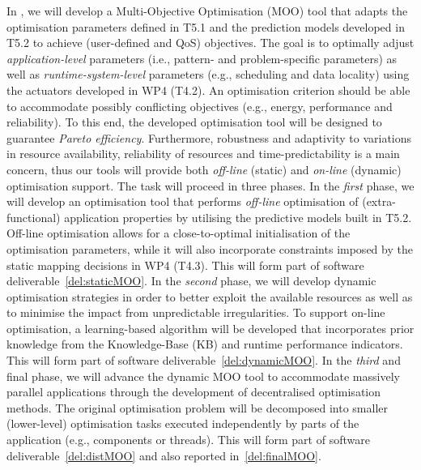 \begin{Workpackage}{\thewpno}
\begin{Task}
In \theTask, we will develop a Multi-Objective Optimisation (MOO) tool that adapts the optimisation parameters defined in T5.1 and the prediction models developed in T5.2 to achieve (user-defined and QoS) objectives. The goal is to optimally adjust \emph{application-level} parameters (i.e., pattern- and problem-specific parameters) as well as \emph{runtime-system-level} parameters (e.g., scheduling and data locality) using the actuators developed in WP4 (T4.2). An optimisation criterion should be able to accommodate possibly conflicting objectives (e.g., energy, performance and reliability). To this end, the developed optimisation tool will be designed to guarantee \emph{Pareto efficiency}. Furthermore, robustness and adaptivity to variations in resource availability, reliability of resources and time-predictability is a main concern, thus our tools will provide both \emph{off-line} (static) and \emph{on-line} (dynamic) optimisation support.
%
%
The task will proceed in three phases.
In the \emph{first} phase, we will develop an optimisation tool that performs \emph{off-line} optimisation of (extra-functional) application properties by utilising the predictive models built in T5.2. Off-line optimisation allows for a close-to-optimal initialisation of the optimisation parameters, while it will also incorporate constraints imposed by the static mapping decisions in WP4 (T4.3). This will form part of software deliverable~\ref{del:staticMOO}. In the \emph{second} phase, we will develop dynamic optimisation strategies in order to better exploit the available resources as well as to minimise the impact from unpredictable irregularities. To support on-line optimisation, a learning-based algorithm will be developed that incorporates prior knowledge from the 
Knowledge-Base (KB) and runtime performance indicators. This will form part of software deliverable~\ref{del:dynamicMOO}. In the \emph{third} and final phase, we will advance the dynamic MOO tool to accommodate massively parallel applications through the development of decentralised optimisation methods. The original optimisation problem will be decomposed into smaller (lower-level) optimisation tasks executed independently by parts of the application (e.g., components or threads). This will form part of software deliverable~\ref{del:distMOO} and also reported in~\ref{del:finalMOO}.



\end{Task}
\end{Workpackage}
